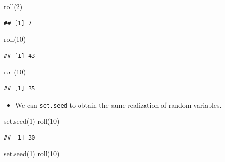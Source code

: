 \documentclass[
]{book}
\newenvironment{Shaded}{\begin{snugshade}}{\end{snugshade}}
\newcommand{\DecValTok}[1]{\textcolor[rgb]{0.00,0.00,0.81}{#1}}
\newcommand{\FunctionTok}[1]{\textcolor[rgb]{0.00,0.00,0.00}{#1}}
\newcommand{\NormalTok}[1]{#1}
\providecommand{\tightlist}{%
  \setlength{\itemsep}{0pt}\setlength{\parskip}{0pt}}
\begin{document}
\begin{Shaded}
\begin{Highlighting}[]
\FunctionTok{roll}\NormalTok{(}\DecValTok{2}\NormalTok{)}
\end{Highlighting}
\end{Shaded}

\begin{verbatim}
## [1] 7
\end{verbatim}

\begin{Shaded}
\begin{Highlighting}[]
\FunctionTok{roll}\NormalTok{(}\DecValTok{10}\NormalTok{)}
\end{Highlighting}
\end{Shaded}

\begin{verbatim}
## [1] 43
\end{verbatim}

\begin{Shaded}
\begin{Highlighting}[]
\FunctionTok{roll}\NormalTok{(}\DecValTok{10}\NormalTok{)}
\end{Highlighting}
\end{Shaded}

\begin{verbatim}
## [1] 35
\end{verbatim}

\begin{itemize}
\tightlist
\item
  We can \texttt{set.seed} to obtain the same realization of random variables.
\end{itemize}

\begin{Shaded}
\begin{Highlighting}[]
\FunctionTok{set.seed}\NormalTok{(}\DecValTok{1}\NormalTok{)}
\FunctionTok{roll}\NormalTok{(}\DecValTok{10}\NormalTok{)}
\end{Highlighting}
\end{Shaded}

\begin{verbatim}
## [1] 30
\end{verbatim}

\begin{Shaded}
\begin{Highlighting}[]
\FunctionTok{set.seed}\NormalTok{(}\DecValTok{1}\NormalTok{)}
\FunctionTok{roll}\NormalTok{(}\DecValTok{10}\NormalTok{)}
\end{Highlighting}
\end{Shaded}
\end{document}
